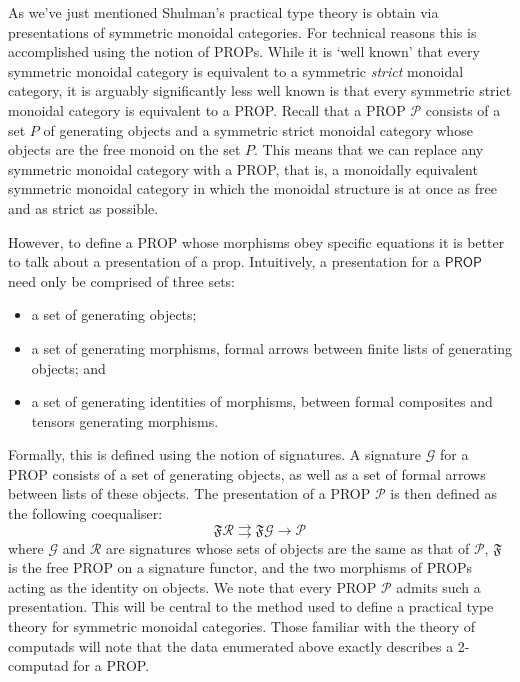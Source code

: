 \documentclass[pra,floatfix,
amsmath,superscriptaddress, 12pt]{article}
\theoremstyle{definition}
\newcommand{\mc}[1]{\mathcal{#1}}
\begin{document}
As we've just mentioned Shulman's practical type theory is obtain via  presentations of symmetric monoidal categories. For technical reasons this is accomplished using the notion of PROPs.
While it is `well known' that every symmetric monoidal category is equivalent
to a symmetric \emph{strict} monoidal category, it is arguably significantly less well known
is that every symmetric strict monoidal category is equivalent to
a PROP. Recall that a PROP $\mc{P}$ consists of a set $P$ of generating objects and a symmetric strict monoidal category whose objects are the free monoid on the set $P$.
This means that we can replace any symmetric monoidal category with a PROP, that is, a monoidally equivalent symmetric monoidal category in which the monoidal structure is at once as free and as strict as possible. 

However, to define a PROP whose morphisms obey specific equations it is better to talk about a presentation of a prop.
Intuitively, a presentation for a $\mathsf{PROP}$ need only be comprised of three sets:
\begin{itemize}
\item a set of generating objects;
\item a set of generating morphisms, formal arrows between finite lists
of generating objects; and
\item a set of generating identities of morphisms, between formal composites
and tensors generating morphisms.
\end{itemize}
Formally, this is defined using the notion of signatures. A signature $\mc{G}$ for a PROP consists of a set of generating objects, as well as a set of formal arrows between lists of these objects. The presentation of a PROP $\mc{P}$ is then defined as the following coequaliser: 
$$\mathfrak{F}\mc{R} \rightrightarrows \mathfrak{F}\mc{G} \rightarrow \mc{P}$$ where $\mc{G}$ and $\mc{R}$ are signatures whose sets of objects are the same as that of $\mc{P}$, $\mathfrak{F}$ is the free PROP on a signature functor, and the two morphisms of PROPs acting as the identity on objects.
We note that every PROP $\mc{P}$ admits such a presentation. This will be central to the method used to define a practical type theory for symmetric monoidal categories. Those familiar with the theory of computads will note that the data enumerated above exactly describes a 2-computad for a PROP.

\end{document}
